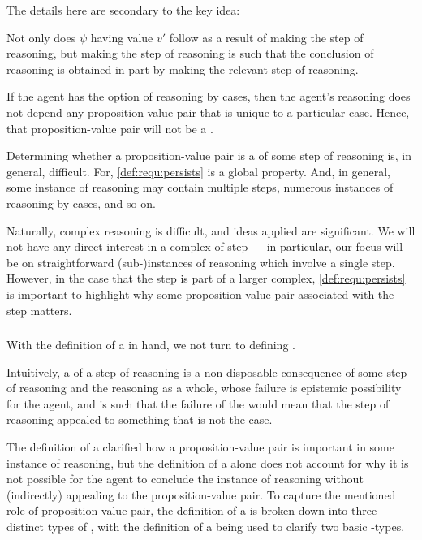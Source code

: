 \begin{note}
  The details here are secondary to the key idea:

  Not only does \(\psi\) having value \(v'\) follow as a result of making the step of reasoning, but making the step of reasoning is such that the conclusion of reasoning is obtained in part by making the relevant step of reasoning.

  If the agent has the option of reasoning by cases, then the agent's reasoning does not depend any proposition-value pair that is unique to a particular case.
  Hence, that proposition-value pair will not be a \result{}.
\end{note}

\begin{note}
  Determining whether a proposition-value pair is a \result{} of some step of reasoning is, in general, difficult.
  For, \ref{def:requ:persists} is a global property.
  And, in general, some instance of reasoning may contain multiple steps, numerous instances of reasoning by cases, and so on.

  Naturally, complex reasoning is difficult, and ideas applied are significant.
  We will not have any direct interest in a complex of step --- in particular, our focus will be on straightforward (sub-)instances of reasoning which involve a single step.
  However, in the case that the step is part of a larger complex, \ref{def:requ:persists} is important to highlight why some proposition-value pair associated with the step matters.
\end{note}

\subsubsection{}
\label{sec:def-of-requ}

\begin{note}
  With the definition of a \result{} in hand, we not turn to defining .
\end{note}

\begin{note}
  Intuitively, a \requ{} of a step of reasoning is a non-disposable consequence of some step of reasoning and the reasoning as a whole, whose failure is epistemic possibility for the agent, and is such that the failure of the \requ{} would mean that the step of reasoning appealed to something that is not the case.

  The definition of a \result{} clarified how a proposition-value pair is important in some instance of reasoning, but the definition of a \result{} alone does not account for why it is not possible for the agent to conclude the instance of reasoning without (indirectly) appealing to the proposition-value pair.
  To capture the mentioned role of proposition-value pair, the definition of a \requ{} is broken down into three distinct types of \requ{}, with the definition of a \result{} being used to clarify two basic \requ{}-types.
\end{note}

